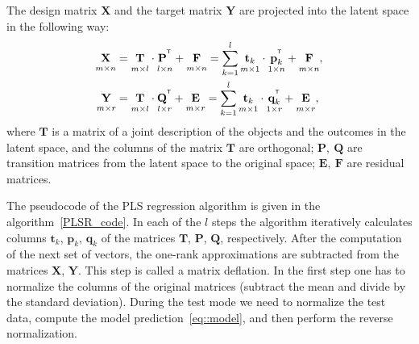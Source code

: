 \documentclass[12pt,twoside]{article}
\newcommand{\bY}{\mathbf{Y}}
\newcommand{\bX}{\mathbf{X}}
\newcommand{\bt}{\mathbf{t}}
\newcommand{\bp}{\mathbf{p}}
\newcommand{\bq}{\mathbf{q}}
\newcommand{\bP}{\mathbf{P}}
\newcommand{\bT}{\mathbf{T}}
\newcommand{\bQ}{\mathbf{Q}}
\newcommand{\bE}{\mathbf{E}}
\newcommand{\bF}{\mathbf{F}}
\newcommand{\T}{^{\text{\tiny\sffamily\upshape\mdseries T}}}
\begin{document}
The design matrix $\bX$ and the target matrix $\bY$ are projected into the latent space in the following way:
\begin{align}
\label{eq::PLS_X}
 \underset{m \times n}{\vphantom{\bQ}\bX} 
 &= \underset{m \times l}{\vphantom{\bQ}\bT} \cdot \underset{l \times n}{\vphantom{\bQ}\bP^{\T}} + \underset{m \times n}{\vphantom{\bQ}\bF} 
 = \sum_{k=1}^l \underset{m \times 1}{\vphantom{\bp_k^{\T}}\bt_k} \cdot \underset{1 \times n}{\bp_k^{\T}} + \underset{m \times n}{\vphantom{\bp_k^{\T}}\bF},\\
 \label{eq::PLS_Y}
 \underset{m \times r}{\vphantom{\bQ}\bY} 
 &= \underset{m \times l}{\vphantom{\bQ}\bT} \cdot \underset{l \times r}{\bQ^{\T}} + \underset{m \times r}{\vphantom{\bQ}\bE}
 =  \sum_{k=1}^l  \underset{m \times 1}{\vphantom{\bq_k^{\T}}\bt_k} \cdot \underset{1 \times r}{\bq_k^{\T}} +  \underset{m \times r}{\vphantom{\bq_k^{\T}}\bE},
\end{align}
where $\bT$ is a matrix of a joint description of the objects and the outcomes in the latent space, and the columns of the matrix $\bT$ are orthogonal; $\bP,\ \bQ$ are transition matrices from the latent space to the original space; $\bE,\ \bF$ are residual matrices.

The pseudocode of the PLS regression algorithm is given in the algorithm~\ref{PLSR_code}.
In each of the $l$ steps the algorithm iteratively calculates columns $\bt_k$, $\bp_k$, $\bq_k$ of the matrices $\bT$, $\bP$, $\bQ$, respectively. 
After the computation of the next set of vectors, the one-rank approximations are subtracted from the matrices $\bX$, $\bY$. 
This step is called a matrix deflation.
In the first step one has to normalize the columns of the original matrices (subtract the mean and divide by the standard deviation).
During the test mode we need to normalize the test data, compute the model prediction~\eqref{eq::model}, and then perform the reverse normalization.
\end{document}

